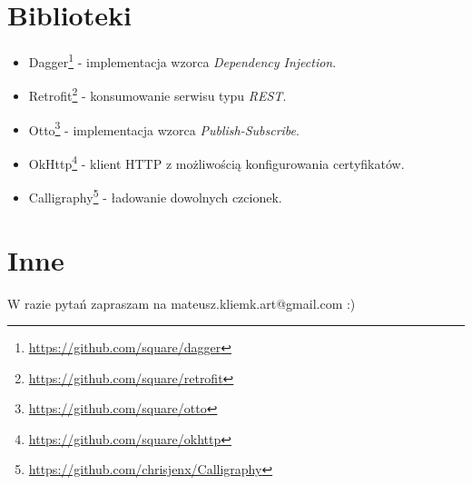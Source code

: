 \documentclass[12pt]{article}
\begin{document}
\section{Biblioteki}
\begin{itemize}
 \item Dagger\footnote{\url{https://github.com/square/dagger}} - implementacja wzorca \textit{Dependency Injection}.
 \item Retrofit\footnote{\url{https://github.com/square/retrofit}} - konsumowanie serwisu typu \textit{REST}.
 \item Otto\footnote{\url{https://github.com/square/otto}} - implementacja wzorca \textit{Publish-Subscribe}.
 \item OkHttp\footnote{\url{https://github.com/square/okhttp}} - klient HTTP z możliwością konfigurowania certyfikatów.
 \item Calligraphy\footnote{\url{https://github.com/chrisjenx/Calligraphy}} - ładowanie dowolnych czcionek.
\end{itemize}

\section{Inne}
W razie pytań zapraszam na mateusz.kliemk.art@gmail.com :)
\end{document}
